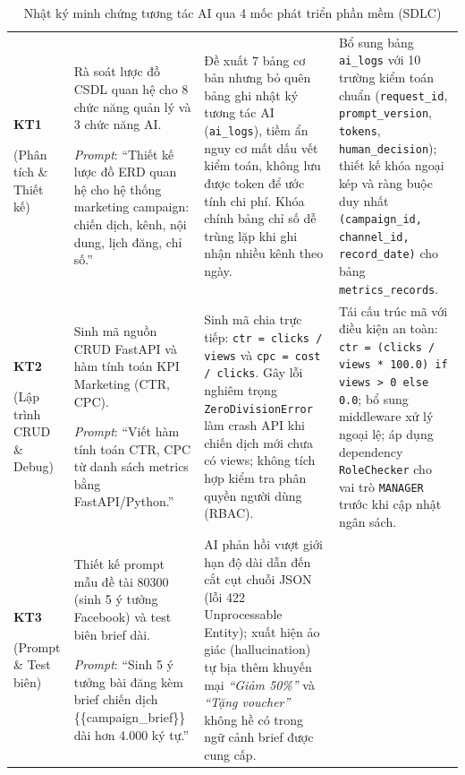 \begin{table}[!htbp]
\centering
\small
\renewcommand{\arraystretch}{1.15}
\caption{Nhật ký minh chứng tương tác AI qua 4 mốc phát triển phần mềm (SDLC)}\label{tab:v8-sdlc-ai-log}
\begin{tabularx}{\textwidth}{|C{1.8cm}|L{3.2cm}|Y|Y|}
\hline
{} &  &  &  \\
\hline
\textbf{KT1}\par (Phân tích \& Thiết kế) &
Rà soát lược đồ CSDL quan hệ cho 8 chức năng quản lý và 3 chức năng AI.\par
\textit{Prompt}: ``Thiết kế lược đồ ERD quan hệ cho hệ thống marketing campaign: chiến dịch, kênh, nội dung, lịch đăng, chỉ số.'' &
Đề xuất 7 bảng cơ bản nhưng bỏ quên bảng ghi nhật ký tương tác AI (\texttt{ai\_logs}), tiềm ẩn nguy cơ mất dấu vết kiểm toán, không lưu được token để ước tính chi phí. Khóa chính bảng chỉ số dễ trùng lặp khi ghi nhận nhiều kênh theo ngày. &
Bổ sung bảng \texttt{ai\_logs} với 10 trường kiểm toán chuẩn (\texttt{request\_id}, \texttt{prompt\_version}, \texttt{tokens}, \texttt{human\_decision}); thiết kế khóa ngoại kép và ràng buộc duy nhất \texttt{(campaign\_id, channel\_id, record\_date)} cho bảng \texttt{metrics\_records}. \\
\hline
\textbf{KT2}\par (Lập trình CRUD \& Debug) &
Sinh mã nguồn CRUD FastAPI và hàm tính toán KPI Marketing (CTR, CPC).\par
\textit{Prompt}: ``Viết hàm tính toán CTR, CPC từ danh sách metrics bằng FastAPI/\allowbreak Python.'' &
Sinh mã chia trực tiếp: \texttt{ctr = clicks / views} và \texttt{cpc = cost / clicks}. Gây lỗi nghiêm trọng \texttt{ZeroDivision}\allowbreak\texttt{Error} làm crash API khi chiến dịch mới chưa có views; không tích hợp kiểm tra phân quyền người dùng (RBAC). &
Tái cấu trúc mã với điều kiện an toàn: \texttt{ctr = (clicks / views * 100.0) if views > 0 else 0.0}; bổ sung middleware xử lý ngoại lệ; áp dụng dependency \texttt{RoleChecker} cho vai trò \texttt{MANAGER} trước khi cập nhật ngân sách. \\
\hline
\textbf{KT3}\par (Prompt \& Test biên) &
Thiết kế prompt mẫu đề tài 80300 (sinh 5 ý tưởng Facebook) và test biên brief dài.\par
\textit{Prompt}: ``Sinh 5 ý tưởng bài đăng kèm brief chiến dịch \{\{campaign\_brief\}\} dài hơn 4.000 ký tự.'' &
AI phản hồi vượt giới hạn độ dài dẫn đến cắt cụt chuỗi JSON (lỗi 422 Unprocessable Entity); xuất hiện ảo giác (hallucination) tự bịa thêm khuyến mại \textit{``Giảm 50\%''} và \textit{``Tặng voucher''} không hề có trong ngữ cảnh brief được cung cấp. &

\end{tabularx}
\end{table}
